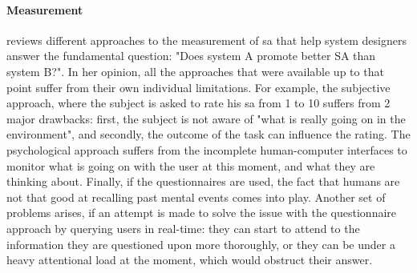 \paragraph{Measurement}
\parencite[p.~791-792]{endsley_situation_1988} reviews different approaches to the measurement of \gls{sa} that help system designers answer the fundamental question: "Does system A promote better SA than system B?". In her opinion, all the approaches that were available up to that point suffer from their own individual limitations. For example, the subjective approach, where the subject is asked to rate his \gls{sa} from 1 to 10 suffers from 2 major drawbacks: first, the subject is not aware of "what is really going on in the environment", and secondly, the outcome of the task can influence the rating. The psychological approach suffers from the incomplete human-computer interfaces to monitor what is going on with the user at this moment, and what they are thinking about. Finally, if the questionnaires are used, the fact that humans are not that good at recalling past mental events comes into play. Another set of problems arises, if an attempt is made to solve the issue with the questionnaire approach by querying users in real-time: they can start to attend to the information they are questioned upon more thoroughly, or they can be under a heavy attentional load at the moment, which would obstruct their answer.

